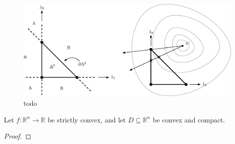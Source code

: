 \documentclass[eikonal.tex]{subfiles}
\begin{document}
\begin{figure}
  \centering
  \includegraphics{direct-skipping.eps}
  \caption{todo}
\end{figure}

\begin{lemma}
  Let $f : \mathbb{R}^n \to \mathbb{R}$ be strictly convex, and let
  $D \subseteq \mathbb{R}^n$ be convex and compact. 
\end{lemma}

\begin{proof}
  
\end{proof}
\end{document}
